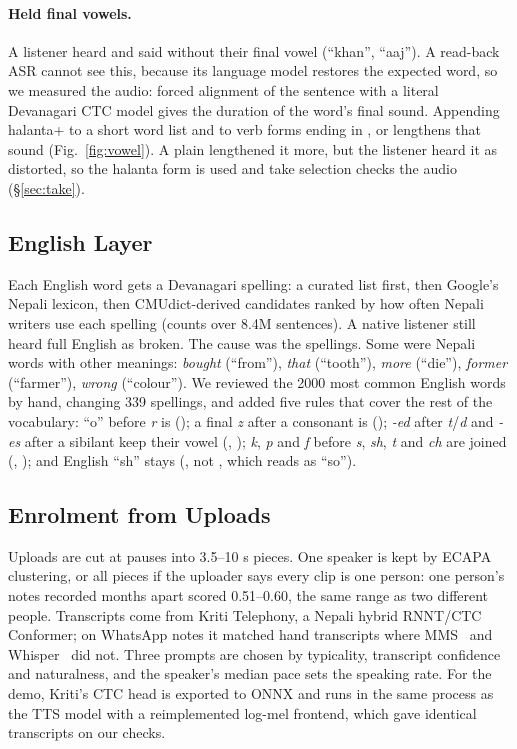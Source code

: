 \paragraph{Held final vowels.} A listener heard  and  said without their final vowel (``khan'', ``aaj''). A read-back ASR cannot see this, because its language model restores the expected word, so we measured the audio: forced alignment of the sentence with a literal Devanagari CTC model gives the duration of the word's final sound. Appending halanta+ to a short word list and to verb forms ending in ,  or  lengthens that sound (Fig.~\ref{fig:vowel}). A plain  lengthened it more, but the listener heard it as distorted, so the halanta form is used and take selection checks the audio (\S\ref{sec:take}).

\subsection{English Layer}\label{sec:english}
Each English word gets a Devanagari spelling: a curated list first, then Google's Nepali lexicon, then CMUdict-derived candidates ranked by how often Nepali writers use each spelling (counts over 8.4M sentences). A native listener still heard full English as broken. The cause was the spellings. Some were Nepali words with other meanings: \emph{bought}  (``from''), \emph{that}  (``tooth''), \emph{more}  (``die''), \emph{former}  (``farmer''), \emph{wrong}  (``colour''). We reviewed the 2000 most common English words by hand, changing 339 spellings, and added five rules that cover the rest of the vocabulary: ``o'' before \emph{r} is  (); a final \emph{z} after a consonant is  (); \emph{-ed} after \emph{t}/\emph{d} and \emph{-es} after a sibilant keep their vowel (, ); \emph{k}, \emph{p} and \emph{f} before \emph{s}, \emph{sh}, \emph{t} and \emph{ch} are joined (, ); and English ``sh'' stays  (, not , which reads as ``so'').

\subsection{Enrolment from Uploads}
Uploads are cut at pauses into 3.5--10 s pieces. One speaker is kept by ECAPA clustering, or all pieces if the uploader says every clip is one person: one person's notes recorded months apart scored 0.51--0.60, the same range as two different people. Transcripts come from Kriti Telephony, a Nepali hybrid RNNT/CTC Conformer; on WhatsApp notes it matched hand transcripts where MMS~\citep{mms} and Whisper~\citep{whisper} did not. Three prompts are chosen by typicality, transcript confidence and naturalness, and the speaker's median pace sets the speaking rate. For the demo, Kriti's CTC head is exported to ONNX and runs in the same process as the TTS model with a reimplemented log-mel frontend, which gave identical transcripts on our checks.

